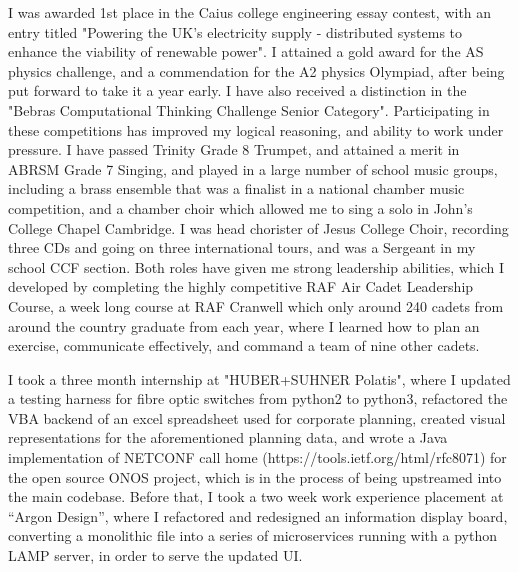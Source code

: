 \documentclass{article}
\begin{document}
I was awarded 1st place in the Caius college engineering essay contest, with an entry titled "Powering the UK's electricity supply - distributed systems to enhance the viability of renewable power". I attained a gold award for the AS physics challenge, and a commendation for the A2 physics Olympiad, after being put forward to take it a year early. I have also received a distinction in the "Bebras Computational Thinking Challenge Senior Category". Participating in these competitions has improved my logical reasoning, and ability to work under pressure. I have passed Trinity Grade 8 Trumpet, and attained a merit in ABRSM Grade 7 Singing, and played in a large number of school music groups, including a brass ensemble that was a finalist in a national chamber music competition, and a chamber choir which allowed me to sing a solo in John's College Chapel Cambridge. I was head chorister of Jesus College Choir, recording three CDs and going on three international tours, and was a Sergeant in my school CCF section. Both roles have given me strong leadership abilities, which I developed by completing the highly competitive RAF Air Cadet Leadership Course, a week long course at RAF Cranwell which only around 240 cadets from around the country graduate from each year, where I learned how to plan an exercise, communicate effectively, and command a team of nine other cadets.


I took a three month internship at "HUBER+SUHNER Polatis", where I updated a testing harness for fibre optic switches from python2 to python3, refactored the VBA backend of an excel spreadsheet used for corporate planning, created visual representations for the aforementioned planning data, and wrote a Java implementation of NETCONF call home (https://tools.ietf.org/html/rfc8071) for the open source ONOS project, which is in the process of being upstreamed into the main codebase. Before that, I took a two week work experience placement at “Argon Design”, where I refactored and redesigned an information display board, converting a monolithic file into a series of microservices running with a python LAMP server, in order to serve the updated UI.
\end{document}
